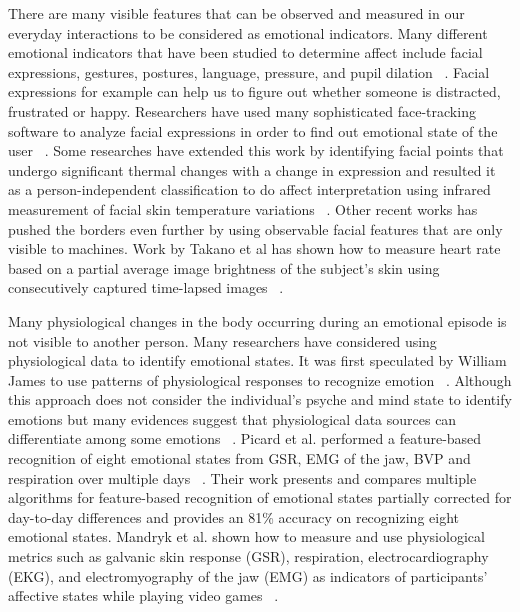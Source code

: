 There are many visible features that can be observed and measured in our everyday interactions to be considered as emotional indicators. Many different emotional indicators that have been studied to determine affect include facial expressions, gestures, postures, language, pressure, and pupil dilation ~\cite{picard2003affective}. Facial expressions for example can help us to figure out whether someone is distracted, frustrated or happy. Researchers have used many sophisticated face-tracking software to analyze facial expressions in order to find out emotional state of the user ~\cite{partala2006real, sebe2006emotion}. Some researches have extended this work by identifying facial points that undergo significant thermal changes with a change in expression and resulted it as a person-independent classification to do affect interpretation using infrared measurement of facial skin temperature variations ~\cite{khan2006automated}. Other recent works has pushed the borders even further by using observable facial features that are only visible to machines. Work by Takano et al has shown how to measure heart rate based on a partial average image brightness of the subject's skin using consecutively captured time-lapsed images ~\cite{takano2007heart}.

Many physiological changes in the body occurring during an emotional episode is not visible to another person. Many researchers have considered using physiological data to identify emotional states. It was first speculated by William James to use patterns of physiological responses to recognize emotion ~\cite{cacioppo2000psychophysiology}. Although this approach does not consider the individual's psyche and mind state to identify emotions but many evidences suggest that physiological data sources can differentiate among some emotions ~\cite{ekman1983autonomic}. Picard et al. performed a feature-based recognition of eight emotional states from GSR, EMG of the jaw, BVP and respiration over multiple days ~\cite{picard2001toward}. Their work presents and compares multiple algorithms for feature-based recognition of emotional states partially corrected for day-to-day differences and provides an 81\% accuracy on recognizing eight emotional states. Mandryk et al. shown how to measure and use physiological metrics such as galvanic skin response (GSR), respiration, electrocardiography (EKG), and electromyography of the jaw (EMG) as indicators of participants' affective states while playing video games ~\cite{mandryk2007fuzzy}.

